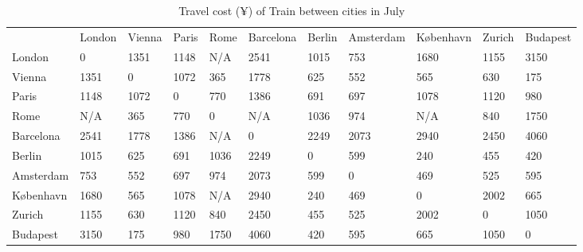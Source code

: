 \documentclass{article} %
\begin{document}
\begin{table}[!ht]
  \centering
  \begin{tabular}{lllllllllll}

     & London & Vienna & Paris & Rome & Barcelona & Berlin & Amsterdam & København & Zurich & Budapest \\

  London & 0 & 1351 & 1148 & N/A & 2541 & 1015 & 753 & 1680 & 1155 & 3150 \\

  Vienna & 1351 & 0 & 1072 & 365 & 1778 & 625 & 552 & 565 & 630 & 175 \\

  Paris & 1148 & 1072 & 0 & 770 & 1386 & 691 & 697 & 1078 & 1120 & 980 \\

  Rome & N/A & 365 & 770 & 0 & N/A & 1036 & 974 & N/A & 840 & 1750 \\

  Barcelona & 2541 & 1778 & 1386 & N/A & 0 & 2249 & 2073 & 2940 & 2450 & 4060 \\

  Berlin & 1015 & 625 & 691 & 1036 & 2249 & 0 & 599 & 240 & 455 & 420 \\

  Amsterdam & 753 & 552 & 697 & 974 & 2073 & 599 & 0 & 469 & 525 & 595 \\

  København & 1680 & 565 & 1078 & N/A & 2940 & 240 & 469 & 0 & 2002 & 665 \\

  Zurich & 1155 & 630 & 1120 & 840 & 2450 & 455 & 525 & 2002 & 0 & 1050 \\

  Budapest & 3150 & 175 & 980 & 1750 & 4060 & 420 & 595 & 665 & 1050 & 0 \\
  \end{tabular}
  \caption{Travel cost (¥) of Train between cities in July}%
  \label{tab:costtrain}
\end{table}
\end{document}
